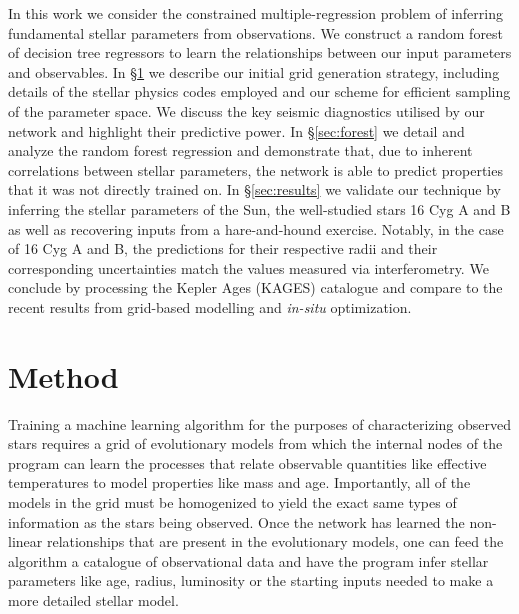 \documentclass[manuscript]{aastex}
\begin{document}
In this work we consider the constrained multiple-regression problem of inferring fundamental stellar parameters from observations. We construct a random forest of decision tree regressors to learn the relationships between our input parameters and observables. In \S \ref{sec:Method} we describe our initial grid generation strategy, including details of the stellar physics codes employed and our scheme for efficient sampling of the parameter space. We discuss the key seismic diagnostics utilised by our network and highlight their predictive power. In \S \ref{sec:forest} we detail and analyze the random forest regression and demonstrate that, due to inherent correlations between stellar parameters, the network is able to predict properties that it was not directly trained on. 
In \S \ref{sec:results} we validate our technique by inferring the stellar parameters of the Sun, the well-studied stars 16 Cyg A and B as well as recovering inputs from a hare-and-hound exercise. Notably, in the case of 16 Cyg A and B, the predictions for their respective radii and their corresponding uncertainties match the values measured via interferometry. We conclude by processing the Kepler Ages (KAGES) catalogue and compare to the recent results from grid-based modelling and \emph{in-situ} optimization. 

\section{Method} \label{sec:Method} 
Training a machine learning algorithm for the purposes of characterizing observed stars requires a grid of evolutionary models from which the internal nodes of the program can learn the processes that relate observable quantities like effective temperatures to model properties like mass and age. Importantly, all of the models in the grid must be homogenized to yield the exact same types of information as the stars being observed. Once the network has learned the non-linear relationships that are present in the evolutionary models, one can feed the algorithm a catalogue of observational data and have the program infer stellar parameters like age, radius, luminosity or the starting inputs needed to make a more detailed stellar model. 
\end{document}
